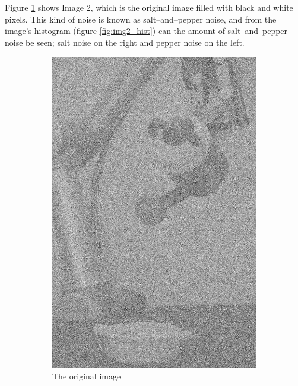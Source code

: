 Figure \ref{fig:img2_src} shows Image 2, which is the original image filled with black and white pixels. This kind of noise is known as salt--and--pepper noise, and from the image's histogram (figure \ref{fig:img2_hist}) can the amount of salt--and--pepper noise be seen; salt noise on the right and pepper noise on the left. 
\begin{figure}[H]
    \centering
    \begin{subfigure}[b]{0.25\textwidth}
        \includegraphics[width=\textwidth]{img2/src.png}
        \caption{The original image}
        \label{fig:img2_src}
    \end{subfigure}
    \begin{subfigure}[b]{0.485\textwidth}

\end{subfigure}
\end{figure}
